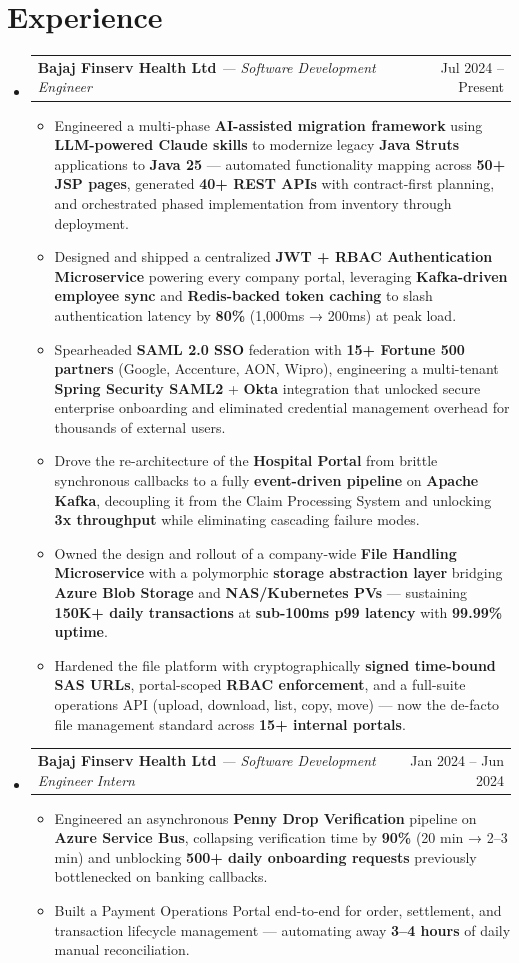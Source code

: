 \documentclass[letterpaper,12pt]{article}
\makeatletter
\newcommand{\resumeItem}[1]{
  \item\small{{\small #1 \vspace{-2pt}}}
}
\newcommand{\resumeSubheading}[4]{
  \vspace{-1pt}\item
    \begin{tabular*}{0.97\textwidth}[t]{l@{\extracolsep{\fill}}r}
      \textbf{#1} \textit{\small{--- #3}} & #2 \\
    \end{tabular*}\vspace{-7pt}
}
\newcommand{\resumeSubHeadingListStart}{\begin{itemize}[leftmargin=0.15in, label={}]}
\newcommand{\resumeSubHeadingListEnd}{\end{itemize}}
\newcommand{\resumeItemListStart}{\begin{itemize}}
\newcommand{\resumeItemListEnd}{\end{itemize}\vspace{-5pt}}
\makeatother
\begin{document}
\section{Experience}
  \resumeSubHeadingListStart
    \resumeSubheading
      {Bajaj Finserv Health Ltd}{Jul 2024 -- Present}
      {Software Development Engineer}{Pune, India}
      \vspace{4pt}
      \resumeItemListStart
\resumeItem{Engineered a multi-phase \textbf{AI-assisted migration framework} using \textbf{LLM-powered Claude skills} to modernize legacy \textbf{Java Struts} applications to \textbf{Java 25} --- automated functionality mapping across \textbf{50+ JSP pages}, generated \textbf{40+ REST APIs} with contract-first planning, and orchestrated phased implementation from inventory through deployment.}
\resumeItem{Designed and shipped a centralized \textbf{JWT + RBAC Authentication Microservice} powering every company portal, leveraging \textbf{Kafka-driven employee sync} and \textbf{Redis-backed token caching} to slash authentication latency by \textbf{80\%} (1,000ms → 200ms) at peak load.}
\resumeItem{Spearheaded \textbf{SAML 2.0 SSO} federation with \textbf{15+ Fortune 500 partners} (Google, Accenture, AON, Wipro), engineering a multi-tenant \textbf{Spring Security SAML2} + \textbf{Okta} integration that unlocked secure enterprise onboarding and eliminated credential management overhead for thousands of external users.}
\resumeItem{Drove the re-architecture of the \textbf{Hospital Portal} from brittle synchronous callbacks to a fully \textbf{event-driven pipeline} on \textbf{Apache Kafka}, decoupling it from the Claim Processing System and unlocking \textbf{3x throughput} while eliminating cascading failure modes.}
\resumeItem{Owned the design and rollout of a company-wide \textbf{File Handling Microservice} with a polymorphic \textbf{storage abstraction layer} bridging \textbf{Azure Blob Storage} and \textbf{NAS/Kubernetes PVs} --- sustaining \textbf{150K+ daily transactions} at \textbf{sub-100ms p99 latency} with \textbf{99.99\% uptime}.}
\resumeItem{Hardened the file platform with cryptographically \textbf{signed time-bound SAS URLs}, portal-scoped \textbf{RBAC enforcement}, and a full-suite operations API (upload, download, list, copy, move) --- now the de-facto file management standard across \textbf{15+ internal portals}.}
\resumeItemListEnd
    \resumeSubheading
      {Bajaj Finserv Health Ltd}{Jan 2024 -- Jun 2024}
      {Software Development Engineer Intern}{Pune, India}
      \resumeItemListStart
        \resumeItem{Engineered an asynchronous \textbf{Penny Drop Verification} pipeline on \textbf{Azure Service Bus}, collapsing verification time by \textbf{90\%} (20 min → 2--3 min) and unblocking \textbf{500+ daily onboarding requests} previously bottlenecked on banking callbacks.}
        \resumeItem{Built a Payment Operations Portal end-to-end for order, settlement, and transaction lifecycle management --- automating away \textbf{3--4 hours} of daily manual reconciliation.}
      \resumeItemListEnd
  \resumeSubHeadingListEnd
\end{document}
